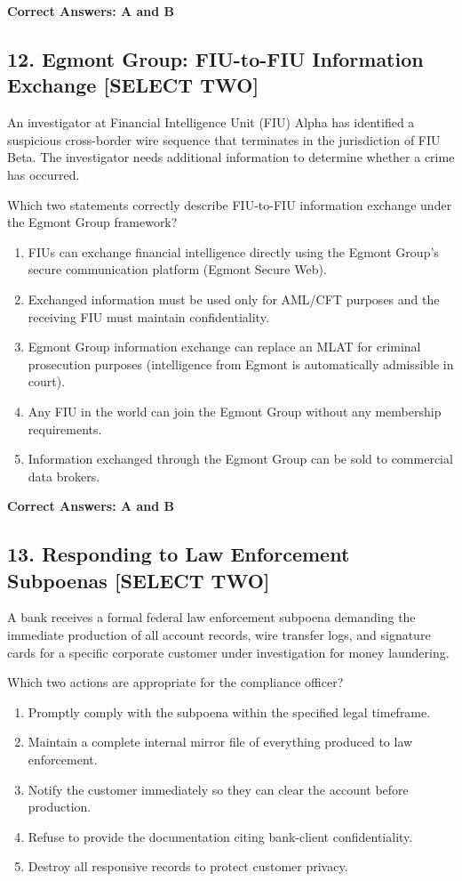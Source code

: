 \documentclass[11pt,a4paper]{article}
\begin{document}
	\textbf{Correct Answers: A and B}
	
	\subsection{12. Egmont Group: FIU-to-FIU Information Exchange \textnormal{[SELECT TWO]}}
	
	An investigator at Financial Intelligence Unit (FIU) Alpha has identified a suspicious cross-border wire sequence that terminates in the jurisdiction of FIU Beta. The investigator needs additional information to determine whether a crime has occurred.
	
	Which two statements correctly describe FIU-to-FIU information exchange under the Egmont Group framework?
	
	\begin{enumerate}[label=\Alph*.]
		\item FIUs can exchange financial intelligence directly using the Egmont Group's secure communication platform (Egmont Secure Web).
		\item Exchanged information must be used only for AML/CFT purposes and the receiving FIU must maintain confidentiality.
		\item Egmont Group information exchange can replace an MLAT for criminal prosecution purposes (intelligence from Egmont is automatically admissible in court).
		\item Any FIU in the world can join the Egmont Group without any membership requirements.
		\item Information exchanged through the Egmont Group can be sold to commercial data brokers.
	\end{enumerate}
	
	\textbf{Correct Answers: A and B}
	
	\subsection{13. Responding to Law Enforcement Subpoenas \textnormal{[SELECT TWO]}}
	
	A bank receives a formal federal law enforcement subpoena demanding the immediate production of all account records, wire transfer logs, and signature cards for a specific corporate customer under investigation for money laundering.
	
	Which two actions are appropriate for the compliance officer?
	
	\begin{enumerate}[label=\Alph*.]
		\item Promptly comply with the subpoena within the specified legal timeframe.
		\item Maintain a complete internal mirror file of everything produced to law enforcement.
		\item Notify the customer immediately so they can clear the account before production.
		\item Refuse to provide the documentation citing bank-client confidentiality.
		\item Destroy all responsive records to protect customer privacy.
	\end{enumerate}
	
\end{document}
